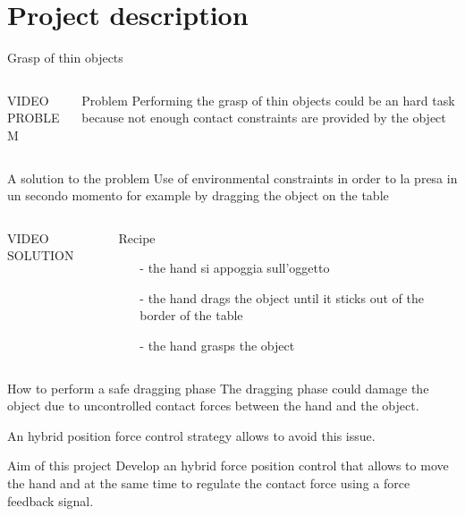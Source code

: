 \section{Project description}
\begin{frame}{Grasp of thin objects}
  \begin{columns}
    \begin{column}{0.5\textwidth}
      VIDEO PROBLEM
    \end{column}
    \begin{column}{0.5\textwidth}
      \begin{alertblock}{Problem}
        Performing the grasp of thin objects could be an hard task
        because not enough contact constraints are provided by the object
      \end{alertblock}
    \end{column}
  \end{columns}
\end{frame}

\begin{frame}{A solution to the problem}
  Use of environmental constraints in order to la presa in un secondo momento
  for example by dragging the object on the table
  \begin{columns}
    \begin{column}{0.5\textwidth}
      VIDEO SOLUTION
    \end{column}
    \begin{column}{0.5\textwidth}
      \begin{exampleblock}{Recipe}
        \begin{itemize}
        \item[-] the hand si appoggia sull'oggetto
        \item[-] the hand drags the object until it \alert{sticks out 
          of the border} of the table 
        \item[-] the hand grasps the object
        \end{itemize}
      \end{exampleblock}
    \end{column}
  \end{columns}
\end{frame}

\begin{frame}{How to perform a safe dragging phase}
  The dragging phase could \alert{damage} the object due to uncontrolled contact forces between the 
  hand and the object.
  \par
  An hybrid position force control strategy allows to avoid this issue.
  \vskip0.5in
  \begin{exampleblock}{Aim of this project}
    Develop an hybrid force position control that allows to move the hand and 
    at the same time to regulate the contact force using a force feedback signal.
  \end{exampleblock}
\end{frame}

